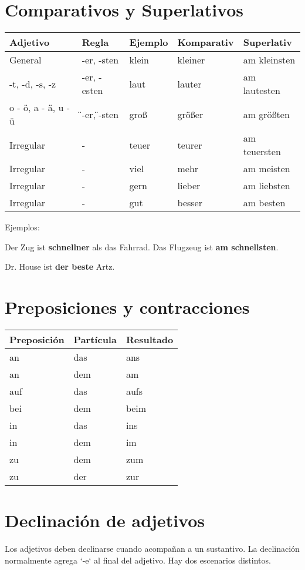 \section{Comparativos y Superlativos}
\begin{tabular}{| l | l | l | l | l |}
\hline
\textbf{Adjetivo} & \textbf{Regla} & \textbf{Ejemplo} & \textbf{Komparativ} & \textbf{Superlativ} \\
\hline
General & -er, -sten & klein & kleiner & am kleinsten \\
-t, -d, -s, -z & -er, -esten & laut & lauter & am lautesten \\
o - ö, a - ä, u - ü & \"{ }-er, \"{ }-sten & groß & größer & am größten \\
Irregular & - & teuer & teurer & am teuersten \\
Irregular & - & viel & mehr & am meisten \\
Irregular & - & gern & lieber & am liebsten \\
Irregular & - & gut & besser & am besten \\
\hline
\end{tabular}

Ejemplos: 
\begin{myitemize}
\item Der Zug ist \textbf{schnellner} als das Fahrrad. Das Flugzeug ist \textbf{am schnellsten}.
\item Dr. House ist \textbf{der beste} Artz.
\end{myitemize}

\section{Preposiciones y contracciones}
\begin{tabular}{| l | l | l |}
\hline
\textbf{Preposición} & \textbf{Partícula} & \textbf{Resultado} \\
\hline
an & das & ans \\
an & dem & am \\
auf & das & aufs \\
bei & dem & beim \\
in & das & ins \\
in & dem & im \\
zu & dem & zum \\
zu & der & zur \\
\hline
\end{tabular}

\section{Declinación de adjetivos}
Los adjetivos deben declinarse cuando acompañan a un sustantivo. La declinación normalmente agrega `-e` al final del adjetivo. Hay dos escenarios distintos.

